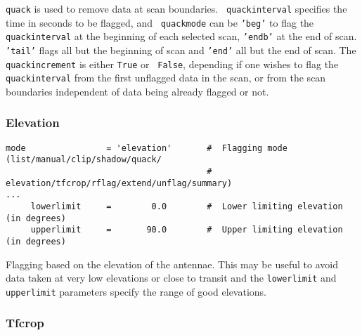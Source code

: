 {\tt quack} is used to remove data at scan boundaries. {\tt
  quackinterval} specifies the time in seconds to be flagged, and {\tt
  quackmode} can be {\tt 'beg'} to flag the {\tt quackinterval} at the
beginning of each selected scan, {\tt 'endb'} at the end of scan. {\tt
  'tail'} flags all but the beginning of scan and {\tt 'end'} all but
the end of scan. The {\tt quackincrement} is either {\tt True} or {\tt
  False}, depending if one wishes to flag the {\tt quackinterval} from
the first unflagged data in the scan, or from the scan boundaries
independent of data being already flagged or not.

\subsubsection{Elevation}
\label{section:edit.tflagdata.mode.elevation}

\small
\begin{verbatim}
mode                = 'elevation'       #  Flagging mode (list/manual/clip/shadow/quack/
                                        #   elevation/tfcrop/rflag/extend/unflag/summary)
...
     lowerlimit     =        0.0        #  Lower limiting elevation (in degrees)
     upperlimit     =       90.0        #  Upper limiting elevation (in degrees)
\end{verbatim}
\normalsize

Flagging based on the elevation of the antennae. This may be useful to
avoid data taken at very low elevations or close to transit and the
{\tt lowerlimit} and {\tt upperlimit} parameters specify the range of
good elevations.


\subsubsection{Tfcrop}
\label{section:edit.tflagdata.mode.tfcrop}

